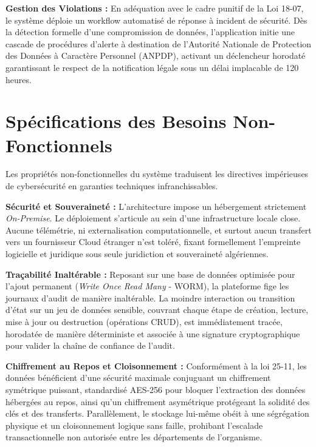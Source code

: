\textbf{Gestion des Violations :} En adéquation avec le cadre punitif de la Loi 18-07, le système déploie un workflow automatisé de réponse à incident de sécurité. Dès la détection formelle d'une compromission de données, l'application initie une cascade de procédures d'alerte à destination de l'Autorité Nationale de Protection des Données à Caractère Personnel (ANPDP), activant un déclencheur horodaté garantissant le respect de la notification légale sous un délai implacable de 120 heures.

\section{Spécifications des Besoins Non-Fonctionnels}
Les propriétés non-fonctionnelles du système traduisent les directives impérieuses de cybersécurité en garanties techniques infranchissables.

\textbf{Sécurité et Souveraineté :} L'architecture impose un hébergement strictement \textit{On-Premise}. Le déploiement s'articule au sein d'une infrastructure locale close. Aucune télémétrie, ni externalisation computationnelle, et surtout aucun transfert vers un fournisseur Cloud étranger n'est toléré, fixant formellement l'empreinte logicielle et juridique sous seule juridiction et souveraineté algériennes.

\textbf{Traçabilité Inaltérable :} Reposant sur une base de données optimisée pour l'ajout permanent (\textit{Write Once Read Many} - WORM), la plateforme fige les journaux d'audit de manière inaltérable. La moindre interaction ou transition d'état sur un jeu de données sensible, couvrant chaque étape de création, lecture, mise à jour ou destruction (opérations CRUD), est immédiatement tracée, horodatée de manière déterministe et associée à une signature cryptographique pour valider la chaîne de confiance de l'audit.

\textbf{Chiffrement au Repos et Cloisonnement :} Conformément à la loi 25-11, les données bénéficient d'une sécurité maximale conjuguant un chiffrement symétrique puissant, standardisé AES-256 pour bloquer l'extraction des données hébergées au repos, ainsi qu'un chiffrement asymétrique protégeant la solidité des clés et des transferts. Parallèlement, le stockage lui-même obéit à une ségrégation physique et un cloisonnement logique sans faille, prohibant l'escalade transactionnelle non autorisée entre les départements de l'organisme.


